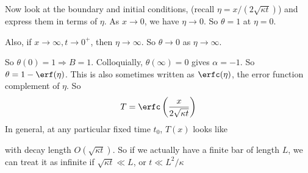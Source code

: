 \documentclass[a4paper]{article}
\begin{document}
\begin{eg}
  Now look at the boundary and initial conditions, (recall $\eta = x/(2\sqrt{\kappa t})$) and express them in terms of $\eta$. As $x \to 0$, we have $\eta \to 0$. So $\theta = 1$ at $\eta = 0$.

  Also, if $x\to \infty, t\to 0^+$, then $\eta \to \infty$. So $\theta \to 0$ as $\eta \to \infty$.

  So $\theta(0) = 1 \Rightarrow B = 1$. Colloquially, $\theta(\infty) = 0$ gives $\alpha = -1$. So $\theta = 1 - \erf(\eta)$. This is also sometimes written as $\erfc(\eta)$, the error function complement of $\eta$. So
  \[
    T = \erfc\left(\frac{x}{2\sqrt{\kappa t}}\right)
  \]
  In general, at any particular fixed time $t_0$, $T(x)$ looks like
  \begin{center}
  \end{center}
  with decay length $O(\sqrt{\kappa t})$. So if we actually have a finite bar of length $L$, we can treat it as infinite if $\sqrt{\kappa t} \ll L$, or $t\ll L^2/\kappa$
\end{eg}
\end{document}
